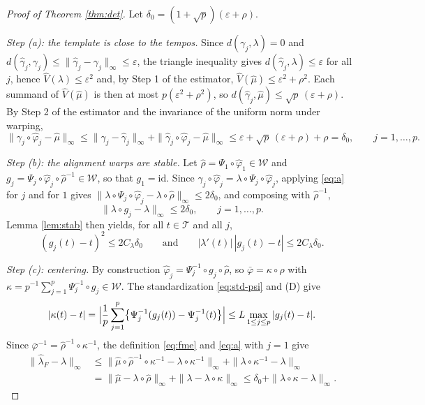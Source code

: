 \documentclass[11pt]{article}
\newcommand{\T}{\mathcal{T}}
\newcommand{\W}{\mathcal{W}}
\newcommand{\lhat}{\hat{\lambda}}
\newcommand{\ghat}{\hat{\gamma}}
\newcommand{\muhat}{\hat{\mu}}
\newcommand{\phihat}{\hat{\varphi}}
\newcommand{\id}{\mathrm{id}}
\newcommand{\norm}[1]{\|#1\|_\infty}
\begin{document}
\begin{proof}[Proof of Theorem \ref{thm:det}]
Let $\delta_0 = (1+\sqrt{p})(\varepsilon+\rho)$.

\emph{Step (a): the template is close to the tempos.} Since $d(\gamma_j,\lambda) = 0$ and
$d(\ghat_j,\gamma_j) \le \norm{\ghat_j-\gamma_j} \le \varepsilon$, the triangle inequality gives
$d(\ghat_j,\lambda)\le\varepsilon$ for all $j$, hence $\hat{V}(\lambda)\le\varepsilon^2$ and,
by Step 1 of the estimator, $\hat{V}(\muhat) \le \varepsilon^2+\rho^2$. Each summand of
$\hat{V}(\muhat)$ is then at most $p(\varepsilon^2+\rho^2)$, so
$d(\ghat_j,\muhat) \le \sqrt{p}\,(\varepsilon+\rho)$. By Step 2 of the estimator and the
invariance of the uniform norm under warping,
\begin{equation}
  \norm{\gamma_j\circ\phihat_j - \muhat}
  \le \norm{\gamma_j - \ghat_j} + \norm{\ghat_j\circ\phihat_j - \muhat}
  \le \varepsilon + \sqrt{p}\,(\varepsilon+\rho) + \rho = \delta_0,
  \qquad j = 1,\ldots,p.
  \label{eq:a}
\end{equation}

\emph{Step (b): the alignment warps are stable.} Let $\hat{\rho} = \Psi_1\circ\phihat_1 \in \W$
and $g_j = \Psi_j\circ\phihat_j\circ\hat{\rho}^{-1} \in \W$, so that $g_1 = \id$. Since
$\gamma_j\circ\phihat_j = \lambda\circ\Psi_j\circ\phihat_j$, applying \eqref{eq:a} for $j$ and
for $1$ gives $\norm{\lambda\circ\Psi_j\circ\phihat_j - \lambda\circ\hat{\rho}} \le 2\delta_0$,
and composing with $\hat{\rho}^{-1}$,
\[
  \norm{\lambda\circ g_j - \lambda} \le 2\delta_0, \qquad j = 1,\ldots,p.
\]
Lemma \ref{lem:stab} then yields, for all $t\in\T$ and all $j$,
\begin{equation}
  (g_j(t)-t)^2 \le 2C_\lambda\delta_0
  \qquad\text{and}\qquad
  |\lambda'(t)|\,|g_j(t)-t| \le 2C_\lambda\delta_0.
  \label{eq:b}
\end{equation}

\emph{Step (c): centering.} By construction $\phihat_j = \Psi_j^{-1}\circ g_j\circ\hat{\rho}$, so
$\bar{\varphi} = \kappa\circ\hat{\rho}$ with
$\kappa = p^{-1}\sum_{j=1}^p \Psi_j^{-1}\circ g_j \in \W$. The standardization
\eqref{eq:std-psi} and (D) give
\begin{equation}
  |\kappa(t) - t|
  = \Bigl|\frac{1}{p}\sum_{j=1}^p \bigl\{\Psi_j^{-1}(g_j(t)) - \Psi_j^{-1}(t)\bigr\}\Bigr|
  \le L\max_{1\le j\le p}|g_j(t)-t|.
  \label{eq:kappa}
\end{equation}
Since $\bar{\varphi}^{-1} = \hat{\rho}^{-1}\circ\kappa^{-1}$, the definition \eqref{eq:fme} and
\eqref{eq:a} with $j=1$ give
\begin{align}
  \norm{\lhat_F - \lambda}
  &\le \norm{\muhat\circ\hat{\rho}^{-1}\circ\kappa^{-1} - \lambda\circ\kappa^{-1}}
     + \norm{\lambda\circ\kappa^{-1} - \lambda} \nonumber\\
  &= \norm{\muhat - \lambda\circ\hat{\rho}} + \norm{\lambda - \lambda\circ\kappa}
  \le \delta_0 + \norm{\lambda\circ\kappa - \lambda}.
  \label{eq:c}
\end{align}


\end{proof}
\end{document}
